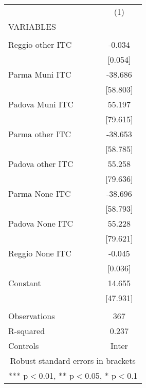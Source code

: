 \begin{tabular}{lc} \hline
 & (1) \\
VARIABLES &  \\ \hline
 &  \\
Reggio other ITC & -0.034 \\
 & [0.054] \\
Parma Muni ITC & -38.686 \\
 & [58.803] \\
Padova Muni ITC & 55.197 \\
 & [79.615] \\
Parma other ITC & -38.653 \\
 & [58.785] \\
Padova other ITC & 55.258 \\
 & [79.636] \\
Parma None ITC & -38.696 \\
 & [58.793] \\
Padova None ITC & 55.228 \\
 & [79.621] \\
Reggio None ITC & -0.045 \\
 & [0.036] \\
Constant & 14.655 \\
 & [47.931] \\
 &  \\
Observations & 367 \\
R-squared & 0.237 \\
 Controls & Inter \\ \hline
\multicolumn{2}{c}{ Robust standard errors in brackets} \\
\multicolumn{2}{c}{ *** p$<$0.01, ** p$<$0.05, * p$<$0.1} \\
\end{tabular}
